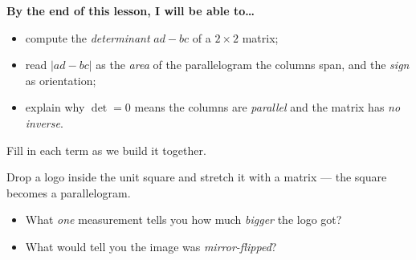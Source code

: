 \documentclass[10pt]{article}
\begin{document}
\namedateperiod

\vspace{0.12in}

\begin{objectivebox}
\textbf{By the end of this lesson, I will be able to\dots}
\begin{itemize}\setlength{\itemsep}{2pt}
  \item compute the \emph{determinant} $ad-bc$ of a $2\times2$ matrix;
  \item read $|ad-bc|$ as the \emph{area} of the parallelogram the columns span, and the \emph{sign} as orientation;
  \item explain why $\det=0$ means the columns are \emph{parallel} and the matrix has \emph{no inverse}.
\end{itemize}
\end{objectivebox}

\vspace{0.08in}

\begin{vocabbox}
\small
Fill in each term as we build it together.
\vspace{2pt}
\end{vocabbox}

\begin{hookbox}
Drop a logo inside the unit square and stretch it with a matrix --- the square becomes a
parallelogram.
\begin{itemize}\setlength{\itemsep}{1pt}
  \item What \emph{one} measurement tells you how much \emph{bigger} the logo got? 
  \item What would tell you the image was \emph{mirror-flipped}? 
\end{itemize}
\end{hookbox}
\end{document}
